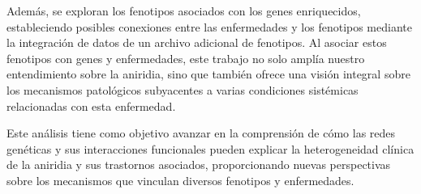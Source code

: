 Además, se exploran los fenotipos asociados con los genes enriquecidos, estableciendo posibles conexiones entre las enfermedades y los fenotipos mediante la integración de datos de un archivo adicional de fenotipos. Al asociar estos fenotipos con genes y enfermedades, este trabajo no solo amplía nuestro entendimiento sobre la aniridia, sino que también ofrece una visión integral sobre los mecanismos patológicos subyacentes a varias condiciones sistémicas relacionadas con esta enfermedad.

Este análisis tiene como objetivo avanzar en la comprensión de cómo las redes genéticas y sus interacciones funcionales pueden explicar la heterogeneidad clínica de la aniridia y sus trastornos asociados, proporcionando nuevas perspectivas sobre los mecanismos que vinculan diversos fenotipos y enfermedades.